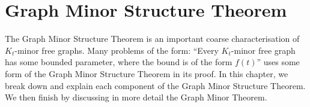 \chapter{Graph Minor Structure Theorem}

The Graph Minor Structure Theorem is an important coarse characterisation of $K_t$-minor free graphs. Many problems of the form: ``Every $K_t$-minor free graph has some bounded parameter, where the bound is of the form $f(t)$'' uses some form of the Graph Minor Structure Theorem in its proof. In this chapter, we break down and explain each component of the Graph Minor Structure Theorem. We then finish by discussing in more detail the Graph Minor Theorem.









